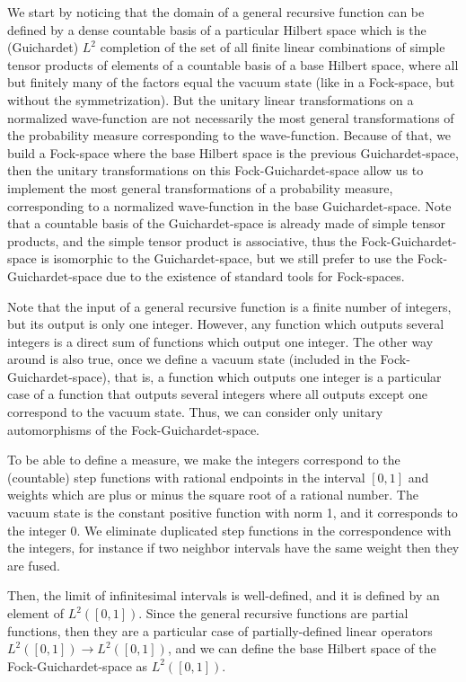\documentclass[11pt,a4paper]{report}
\begin{document}
We start by noticing that the domain of a general recursive function can
be defined by a dense countable basis of a particular Hilbert space
which is the (Guichardet) \(L^2\) completion of the set of all finite
linear combinations of simple tensor products of elements of a countable
basis of a base Hilbert space, where all but finitely many of the
factors equal the vacuum
state\cite{bratteli1987operator} (like in a Fock-space, but without the symmetrization). But the
unitary linear transformations on a normalized wave-function are not
necessarily the most general transformations of the probability measure
corresponding to the wave-function. Because of that, we build a
Fock-space where the base Hilbert space is the previous
Guichardet-space, then the unitary transformations on this
Fock-Guichardet-space allow us to implement the most general
transformations of a probability measure, corresponding to a normalized
wave-function in the base Guichardet-space. Note that a countable basis
of the Guichardet-space is already made of simple tensor products, and
the simple tensor product is associative, thus the Fock-Guichardet-space
is isomorphic to the Guichardet-space, but we still prefer to use the
Fock-Guichardet-space due to the existence of standard tools for
Fock-spaces.

Note that the input of a general recursive function is a finite number
of integers, but its output is only one integer. However, any function
which outputs several integers is a direct sum of functions which output
one integer. The other way around is also true, once we define a vacuum
state (included in the Fock-Guichardet-space), that is, a function which
outputs one integer is a particular case of a function that outputs
several integers where all outputs except one correspond to the vacuum
state. Thus, we can consider only unitary automorphisms of the
Fock-Guichardet-space.

To be able to define a measure, we make the integers correspond to the
(countable) step functions with rational endpoints in the interval
\([0,1]\) and weights which are plus or minus the square root of a
rational number\cite{book91891579}. The vacuum state is the constant positive function
with norm 1, and it corresponds to the integer \(0\). We eliminate
duplicated step functions in the correspondence with the integers, for
instance if two neighbor intervals have the same weight then they are
fused.

Then, the limit of infinitesimal intervals is well-defined, and it is
defined by an element of \(L^2([0,1])\). Since the general recursive
functions are partial functions, then they are a particular case of
partially-defined linear operators \(L^2([0,1])\to L^2([0,1])\), and we
can define the base Hilbert space of the Fock-Guichardet-space as
\(L^2([0,1])\).
\end{document}
